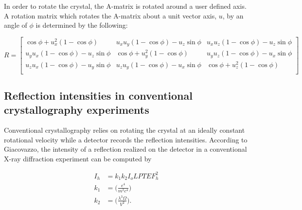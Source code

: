 \documentclass{report}
\begin{document}
In order to rotate the crystal, the A-matrix is rotated around a user defined axis. 
A rotation matrix which rotates the A-matrix about a unit vector axis, $u$, by an angle of $\phi$ is determined by the following:

\begin{equation}
R = \begin{bmatrix}
\cos\phi + u_x^2(1-\cos\phi) & u_xu_y(1 - \cos\phi) - u_z\sin\phi & u_xu_z(1 - \cos\phi) - u_z\sin\phi\\
u_yu_x(1 - \cos\phi) - u_z\sin\phi & \cos \phi + u_y^2(1-\cos \phi) &  u_yu_z(1 - \cos\phi) - u_x\sin\phi\\
u_zu_x(1 - \cos\phi) - u_y\sin\phi & u_zu_y(1 - \cos\phi) - u_x\sin\phi & \cos \phi + u_z^2(1-\cos \phi) \\
\end{bmatrix}
\end{equation}

\subsection{Reflection intensities in conventional crystallography experiments}
Conventional crystallography relies on rotating the crystal at an ideally constant rotational velocity while a detector records the reflection intensities. 
According to Giacovazzo\cite{Giacovazzo2011-wp}, the intensity of a reflection realized on the detector in a conventional X-ray diffraction experiment can be computed by

\begin{align}
I_h &= k_1 k_2 I_o L P T E F_h^2 \nonumber \\
k_1 &= \bigg(\frac{e^4} {m^2c^4} \bigg) \nonumber \\ 
k_2 &= \bigg(\frac{\lambda^3 \Omega} {V^2} \bigg) .\nonumber
\end{align}
\end{document}
